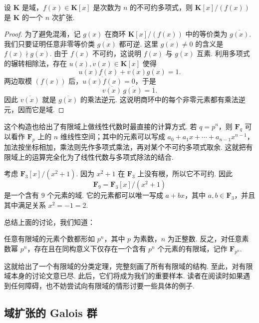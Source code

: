 \begin{theorem}{}{}
    设 $\mathbf{K}$ 是域，$f(x)\in\mathbf{K}[x]$ 是次数为 $n$ 的不可约多项式，则 $\mathbf{K}[x]/(f(x))$ 是 $\mathbf{K}$ 的一个 $n$ 次扩张.
\end{theorem}

\begin{proof}
    为了避免混淆，记 $g(x)$ 在商环 $\mathbf{K}[x]/(f(x))$ 中的等价类为 $\overline{g(x)}$. 我们只要证明任意非零等价类 $\overline{g(x)}$ 都可逆. 这里 $\overline{g(x)}\neq 0$ 的含义是 $f(x)\nmid g(x)$. 由于 $f(x)$ 不可约，这说明 $f(x)$ 与 $g(x)$ 互素. 利用多项式的辗转相除法，存在 $u(x),v(x)\in\mathbf{K}[x]$ 使得
    \[
        u(x)f(x)+v(x)g(x)=1.
    \]
    两边取模 $(f(x))$ 后，$\overline{u(x)f(x)}=0$，于是
    \[
        \overline{v(x)}\,\overline{g(x)}=\overline{1}.
    \]
    因此 $\overline{v(x)}$ 就是 $\overline{g(x)}$ 的乘法逆元. 这说明商环中的每个非零元素都有乘法逆元，因而它是域.
\end{proof}

这个构造也给出了有限域上做线性代数时最直接的计算方式. 若 $q=p^n$，则 $\mathbf{F}_q$ 可以看作 $\mathbf{F}_p$ 上的 $n$ 维线性空间；其中的元素可以写成 $a_0+a_1x+\cdots+a_{n-1}x^{n-1}$，加法按坐标相加，乘法则先作多项式乘法，再对某个不可约多项式取余. 这就把有限域上的运算完全化为了线性代数与多项式除法的结合.

\begin{example}{}{}
    考虑 $\mathbf{F}_3[x]/(x^2+1)$. 因为 $x^2+1$ 在 $\mathbf{F}_3$ 上没有根，所以它不可约. 因此
    \[
        \mathbf{F}_9=\mathbf{F}_3[x]/(x^2+1)
    \]
    是一个含有 $9$ 个元素的域. 它的元素都可以唯一写成 $a+bx$，其中 $a,b\in\mathbf{F}_3$，并且其中满足关系 $x^2=-1=2$.
\end{example}

总结上面的讨论，我们知道：

\begin{theorem}{}{}
    任意有限域的元素个数都形如 $p^n$，其中 $p$ 为素数，$n$ 为正整数. 反之，对任意素数幂 $p^n$，存在且在同构意义下仅存在一个含有 $p^n$ 个元素的有限域，记作 $\mathbf{F}_{p^n}$.
\end{theorem}

这就给出了一个有限域的分类定理，完整刻画了所有有限域的结构. 至此，对有限域本身的讨论文意已尽. 此后，它们将成为我们的重要样本. 读者在阅读时如果遇到任何障碍，也不妨尝试向有限域的情形讨要一些具体的例子.

\subsection{域扩张的 Galois 群}


